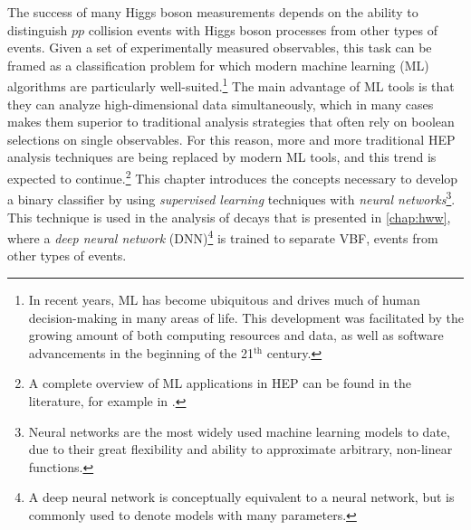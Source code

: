 The success of many Higgs boson measurements depends on the ability to distinguish $pp$ collision events with Higgs boson processes from other types of events. Given a set of experimentally measured observables, this task can be framed as a classification problem for which modern machine learning (ML) algorithms are particularly well-suited.\footnote{In recent years, ML has become ubiquitous and drives much of human decision-making in many areas of life. This development was facilitated by the growing amount of both computing resources and data, as well as software advancements in the beginning of the 21$^{\text{th}}$ century.}
The main advantage of ML tools is that they can analyze high-dimensional data simultaneously, which in many cases makes them superior to traditional analysis strategies that often rely on boolean selections on single observables. 
For this reason, more and more traditional HEP analysis techniques are being replaced by modern ML tools, and this trend is expected to continue.\footnote{A complete overview of ML applications in HEP can be found in the literature, for example in .}
This chapter introduces the concepts necessary to develop a binary classifier by using \emph{supervised learning} techniques with \emph{neural networks}\footnote{Neural networks are the most widely used machine learning models to date, due to their great flexibility and ability to approximate arbitrary, non-linear functions.}.
This technique is used in the analysis of \HWW decays that is presented in \cref{chap:hww}, where a \emph{deep neural network} (DNN)\footnote{A deep neural network is conceptually equivalent to a neural network, but is commonly used to denote models with many parameters.} is trained to separate VBF, \HWW events from other types of events.

